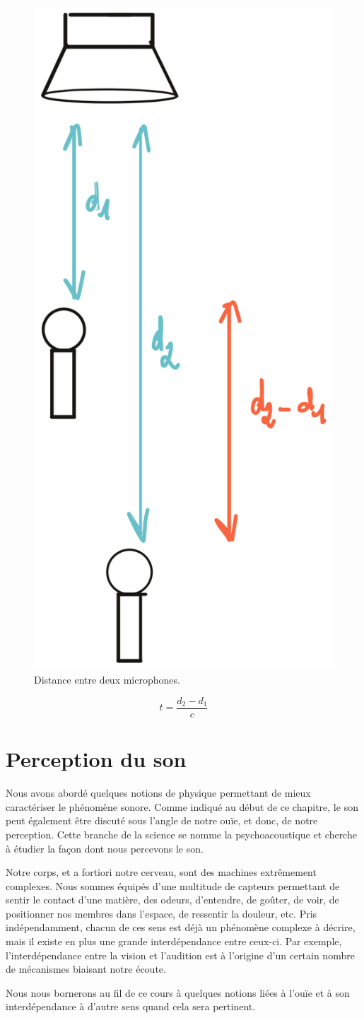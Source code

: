 \documentclass[
]{book}
\begin{document}
\begin{figure}

{\centering \includegraphics[width=0.25\linewidth]{_resources/drawings/mic_dist} 

}

\caption{Distance entre deux microphones.}\label{fig:unnamed-chunk-5}
\end{figure}

\[ t = \frac {d_2-d_1}{c}\]

\hypertarget{perception-du-son}{%
\section{Perception du son}\label{perception-du-son}}

Nous avons abordé quelques notions de physique permettant de mieux caractériser le phénomène sonore. Comme indiqué au début de ce chapitre, le son peut également être discuté sous l'angle de notre ouïe, et donc, de notre perception. Cette branche de la science se nomme la psychoacoustique et cherche à étudier la façon dont nous percevons le son.

Notre corps, et a fortiori notre cerveau, sont des machines extrêmement complexes. Nous sommes équipés d'une multitude de capteurs permettant de sentir le contact d'une matière, des odeurs, d'entendre, de goûter, de voir, de positionner nos membres dans l'espace, de ressentir la douleur, etc. Pris indépendamment, chacun de ces sens est déjà un phénomène complexe à décrire, mais il existe en plus une grande interdépendance entre ceux-ci. Par exemple, l'interdépendance entre la vision et l'audition est à l'origine d'un certain nombre de mécanismes biaisant notre écoute.

Nous nous bornerons au fil de ce cours à quelques notions liées à l'ouïe et à son interdépendance à d'autre sens quand cela sera pertinent.
\end{document}
